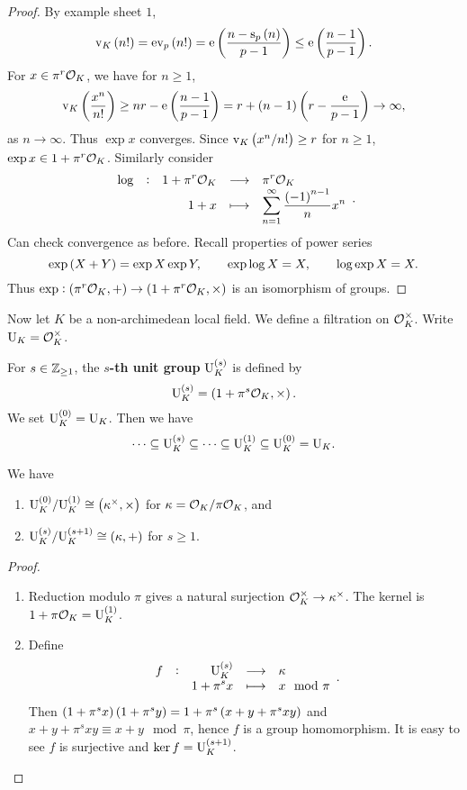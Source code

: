 \begin{proof}
By example sheet $ 1 $,
$$ \v_K\br{n!} = \e\v_p\br{n!} = \e\br{\dfrac{n - \s_p\br{n}}{p - 1}} \le \e\br{\dfrac{n - 1}{p - 1}}. $$
For $ x \in \pi^r\mathcal{O}_K $, we have for $ n \ge 1 $,
$$ \v_K\br{\dfrac{x^n}{n!}} \ge nr - \e\br{\dfrac{n - 1}{p - 1}} = r + \br{n - 1}\br{r - \dfrac{\e}{p - 1}} \to \infty, $$
as $ n \to \infty $. Thus $ \exp x $ converges. Since $ \v_K\br{x^n / n!} \ge r $ for $ n \ge 1 $, $ \exp x \in 1 + \pi^r\mathcal{O}_K $. Similarly consider
$$ \function[\log]{1 + \pi^r\OOO_K}{\pi^r\OOO_K}{1 + x}{\sum_{n = 1}^\infty \dfrac{\br{-1}^{n - 1}}{n}x^n}. $$
Can check convergence as before. Recall properties of power series
$$ \exp \br{X + Y} = \exp X\exp Y, \qquad \exp \log X = X, \qquad \log \exp X = X. $$
Thus $ \exp : \br{\pi^r\OOO_K, +} \to \br{1 + \pi^r\OOO_K, \times} $ is an isomorphism of groups.
\end{proof}

Now let $ K $ be a non-archimedean local field. We define a filtration on $ \mathcal{O}_K^\times $. Write $ \mathrm{U}_K = \mathcal{O}_K^\times $.

\begin{definition}
For $ s \in \mathbb{Z}_{\ge 1} $, the \textbf{$ s $-th unit group} $ \U_K^{\br{s}} $ is defined by
$$ \U_K^{\br{s}} = \br{1 + \pi^s\OOO_K, \times}. $$
We set $ \U_K^{\br{0}} = \U_K $. Then we have
$$ \dots \subseteq \U_K^{\br{s}} \subseteq \dots \subseteq \U_K^{\br{1}} \subseteq \U_K^{\br{0}} = \U_K. $$
\end{definition}

\begin{proposition}
\label{prop:15.3}
We have
\begin{enumerate}
\item $ \U_K^{\br{0}} / \U_K^{\br{1}} \cong \br{\kappa^\times, \times} $ for $ \kappa = \mathcal{O}_K / \pi\mathcal{O}_K $, and
\item $ \U_K^{\br{s}} / \U_K^{\br{s + 1}} \cong \br{\kappa, +} $ for $ s \ge 1 $.
\end{enumerate}
\end{proposition}

\begin{proof}
\hfill
\begin{enumerate}
\item Reduction modulo $ \pi $ gives a natural surjection $ \mathcal{O}_K^\times \to \kappa^\times $. The kernel is $ 1 + \pi\OOO_K = \U_K^{\br{1}} $.
\item Define
$$ \function[f]{\U_K^{\br{s}}}{\kappa}{1 + \pi^sx}{x \mod \pi}. $$
Then $ \br{1 + \pi^sx}\br{1 + \pi^sy} = 1 + \pi^s\br{x + y + \pi^sxy} $ and $ x + y + \pi^sxy \equiv x + y \mod \pi $, hence $ f $ is a group homomorphism. It is easy to see $ f $ is surjective and $ \ker f = \U_K^{\br{s + 1}} $.
\end{enumerate}
\end{proof}

